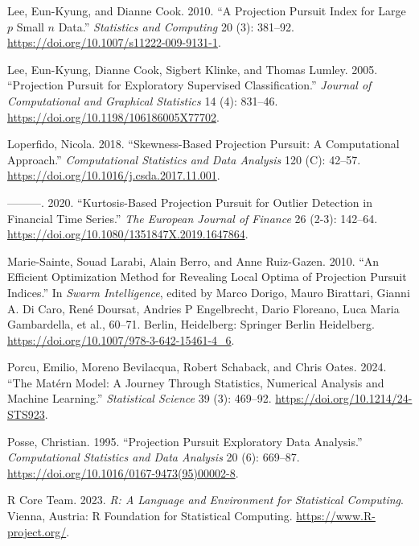 \documentclass[
  12pt,
]{interact}
\newlength{\cslhangindent}
\newlength{\cslentryspacingunit} %
\newenvironment{CSLReferences}[2] %
 {%
  \setlength{\parindent}{0pt}
  \ifodd #1
  \let\oldpar\par
  \def\par{\hangindent=\cslhangindent\oldpar}
  \fi
  \setlength{\parskip}{#2\cslentryspacingunit}
 }%
 {}
\theoremstyle{plain}
\begin{document}
\begin{CSLReferences}{1}{0}
\leavevmode{}%
Lee, Eun-Kyung, and Dianne Cook. 2010. {``A Projection Pursuit Index for
Large {\(p\)} Small {\(n\)} Data.''} \emph{Statistics and Computing} 20
(3): 381--92. \url{https://doi.org/10.1007/s11222-009-9131-1}.

\leavevmode{}%
Lee, Eun-Kyung, Dianne Cook, Sigbert Klinke, and Thomas Lumley. 2005.
{``Projection Pursuit for Exploratory Supervised Classification.''}
\emph{Journal of Computational and Graphical Statistics} 14 (4):
831--46. \url{https://doi.org/10.1198/106186005X77702}.

\leavevmode{}%
Loperfido, Nicola. 2018. {``Skewness-Based Projection Pursuit: A
Computational Approach.''} \emph{Computational Statistics and Data
Analysis} 120 (C): 42--57.
\url{https://doi.org/10.1016/j.csda.2017.11.001}.

\leavevmode{}%
---------. 2020. {``Kurtosis-Based Projection Pursuit for Outlier
Detection in Financial Time Series.''} \emph{The European Journal of
Finance} 26 (2-3): 142--64.
\url{https://doi.org/10.1080/1351847X.2019.1647864}.

\leavevmode{}%
Marie-Sainte, Souad Larabi, Alain Berro, and Anne Ruiz-Gazen. 2010.
{``An Efficient Optimization Method for Revealing Local Optima of
Projection Pursuit Indices.''} In \emph{Swarm Intelligence}, edited by
Marco Dorigo, Mauro Birattari, Gianni A. Di Caro, René Doursat, Andries
P Engelbrecht, Dario Floreano, Luca Maria Gambardella, et al., 60--71.
Berlin, Heidelberg: Springer Berlin Heidelberg.
\url{https://doi.org/10.1007/978-3-642-15461-4_6}.

\leavevmode{}%
Porcu, Emilio, Moreno Bevilacqua, Robert Schaback, and Chris Oates.
2024. {``The {M}atérn Model: A Journey Through Statistics, Numerical
Analysis and Machine Learning.''} \emph{Statistical Science} 39 (3):
469--92. \url{https://doi.org/10.1214/24-STS923}.

\leavevmode{}%
Posse, Christian. 1995. {``Projection Pursuit Exploratory Data
Analysis.''} \emph{Computational Statistics and Data Analysis} 20 (6):
669--87. \url{https://doi.org/10.1016/0167-9473(95)00002-8}.

\leavevmode{}%
R Core Team. 2023. \emph{R: A Language and Environment for Statistical
Computing}. Vienna, Austria: R Foundation for Statistical Computing.
\url{https://www.R-project.org/}.


\end{CSLReferences}
\end{document}
